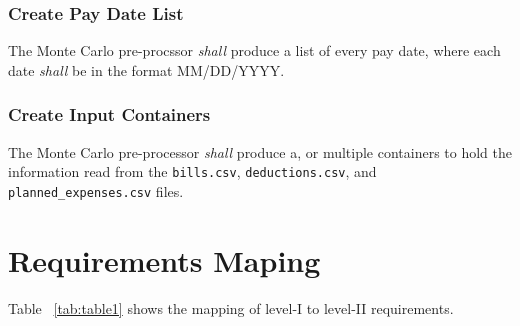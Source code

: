 {\subsubsection{Create Pay Date List}
The Monte Carlo pre-procssor {\textit{shall}} produce a list of
every pay date, where each date {\textit{shall}} be in the format MM/DD/YYYY.

\subsubsection{Create Input Containers}
The Monte Carlo pre-processor {\textit{shall}} produce a, or multiple 
containers to hold the information read from the {\texttt{bills.csv}}, 
{\texttt{deductions.csv}}, and {\texttt{planned\_expenses.csv}} files.
\section{Requirements Maping}
Table ~\ref{tab:table1} shows the mapping of level-I to level-II requirements.

}
